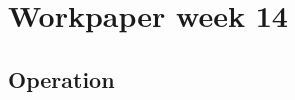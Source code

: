 

\author{Group D608F17}
\title{}



\maketitle

\section{Workpaper week 14}\citep{Meredith2005}

\subsection{Operation}



\grid
\grid
